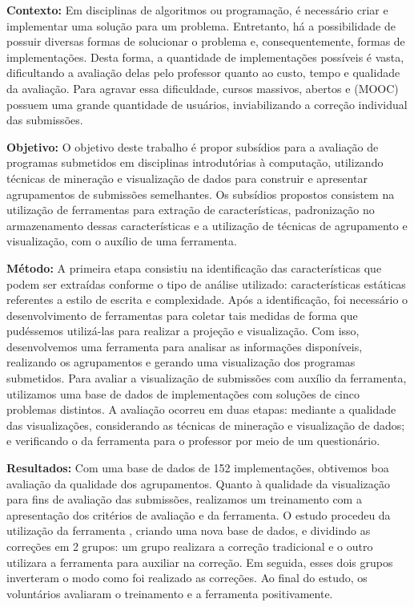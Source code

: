 \begin{resumo}
\textbf{Contexto:} Em disciplinas de algoritmos ou programação, é necessário criar
e implementar uma solução para um problema. Entretanto, há a possibilidade de possuir
diversas formas de solucionar o problema e, consequentemente, formas de implementações.
Desta forma, a quantidade de implementações possíveis é vasta, dificultando a avaliação
delas pelo professor quanto ao custo, tempo e qualidade da avaliação.
Para agravar essa dificuldade, cursos massivos, abertos e  (MOOC)
possuem uma grande quantidade de usuários, inviabilizando
a correção individual das submissões.

\textbf{Objetivo:} O objetivo deste trabalho é propor subsídios para a avaliação de
programas submetidos em disciplinas introdutórias à computação, utilizando técnicas
de mineração e visualização de dados para construir e apresentar agrupamentos de
submissões semelhantes. Os subsídios propostos consistem na utilização de ferramentas
para extração de características, padronização no armazenamento dessas características
e a utilização de técnicas de agrupamento e visualização, com o auxílio de uma ferramenta.

\textbf{Método:} A primeira etapa consistiu na identificação das características que
podem ser extraídas conforme o tipo de análise utilizado: características estáticas
referentes a estilo de escrita e complexidade. Após a identificação, foi necessário
o desenvolvimento de ferramentas para coletar tais medidas de forma que pudéssemos
utilizá-las para realizar a projeção e visualização. Com isso, desenvolvemos uma
ferramenta para analisar as informações disponíveis, realizando os agrupamentos e
gerando uma visualização dos programas submetidos.
Para avaliar a visualização de submissões com auxílio da ferramenta, utilizamos
uma base de dados de implementações com soluções de cinco
problemas distintos. A avaliação ocorreu em duas etapas: mediante a qualidade
das visualizações, considerando as técnicas de mineração e visualização de dados; e
verificando o  da ferramenta para o professor por meio de um
questionário.

\textbf{Resultados:} Com uma base de dados de 152 implementações, obtivemos boa
avaliação da qualidade dos agrupamentos. Quanto à qualidade da visualização para
fins de avaliação das submissões, realizamos um treinamento com a apresentação
dos critérios de avaliação e da ferramenta. O estudo procedeu da utilização da
ferramenta , criando uma nova base de dados, e dividindo
as correções em 2 grupos: um grupo realizara a correção tradicional e o outro
utilizara a ferramenta para auxiliar na correção. Em seguida, esses dois grupos
inverteram o modo como foi realizado as correções. Ao final do estudo,
os voluntários avaliaram o treinamento e a ferramenta positivamente.


\end{resumo}
